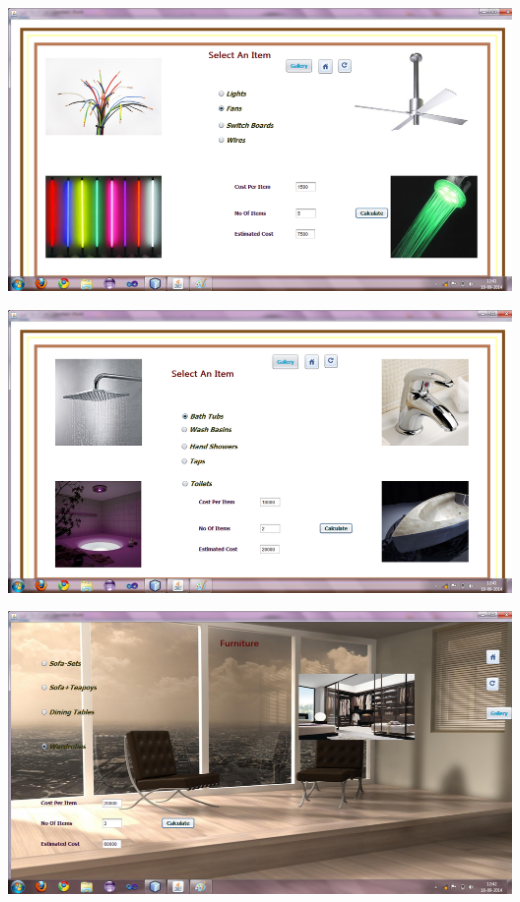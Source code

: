 \documentclass[12pt,a4paper]{report}
\begin{document}
\begin{center}
\includegraphics[scale=0.45]{6.png}
\end{center}
\begin{center}
\includegraphics[scale=0.45]{7.png}
\end{center}
\begin{center}
\includegraphics[scale=0.45]{8.png}
\end{center}
\end{document}
